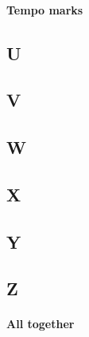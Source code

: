 \documentclass[12pt, a4paper, oneside]{book}
\begin{document}
\paragraph{Tempo marks}

	\subsection{U}

	\subsection{V}

	\subsection{W}

	\subsection{X}

	\subsection{Y}

	\subsection{Z}








\paragraph{All together}









\end{document}
